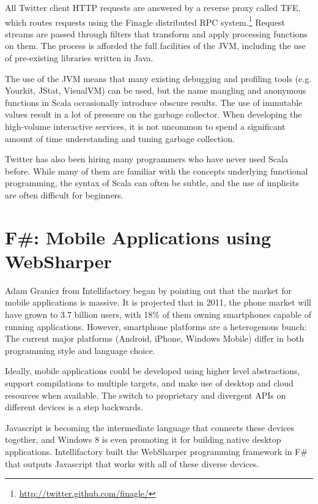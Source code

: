 \documentclass{jfp1}
\begin{document}
All Twitter client HTTP requests are answered by a reverse proxy called TFE,
which routes requests using the Finagle distributed RPC
system.\footnote{\url{http://twitter.github.com/finagle/}} Request streams are
passed through filters that transform and apply processing functions on them.
The process is afforded the full facilities of the JVM, including the use of
pre-existing libraries written in Java.

The use of the JVM means that many existing debugging and profiling tools (e.g.
Yourkit, JStat, VisualVM) can be used, but the name mangling and anonymous
functions in Scala occasionally introduce obscure results.  The use of
immutable values result in a lot of pressure on the garbage collector. When
developing the high-volume interactive services, it is not uncommon to spend a
significant amount of time understanding and tuning garbage collection.

Twitter has also been hiring many programmers who have never used Scala before.
While many of them are familiar with the concepts underlying functional
programming, the syntax of Scala can often be subtle, and the use of implicits
are often difficult for beginners.

\section{F\#: Mobile Applications using WebSharper}

Adam Granicz from Intellifactory began by pointing out that the market for
mobile applications is massive.  It is projected that in 2011, the phone market
will have grown to 3.7 billion users, with 18\% of them owning smartphones
capable of running applications.  However, smartphone platforms are a
heterogenous bunch: The current major platforms (Android, iPhone, Windows
Mobile) differ in both programming style and language choice.

Ideally, mobile applications could be developed using higher level
abstractions, support compilations to multiple targets, and make use of desktop
and cloud resources when available. The switch to proprietary and divergent
APIs on different devices is a step backwards.

Javascript is becoming the intermediate language that connects these devices
together, and Windows 8 is even promoting it for building native desktop
applications. Intellifactory built the WebSharper programming framework in F\#
that outputs Javascript that works with all of these diverse devices.
\end{document}
